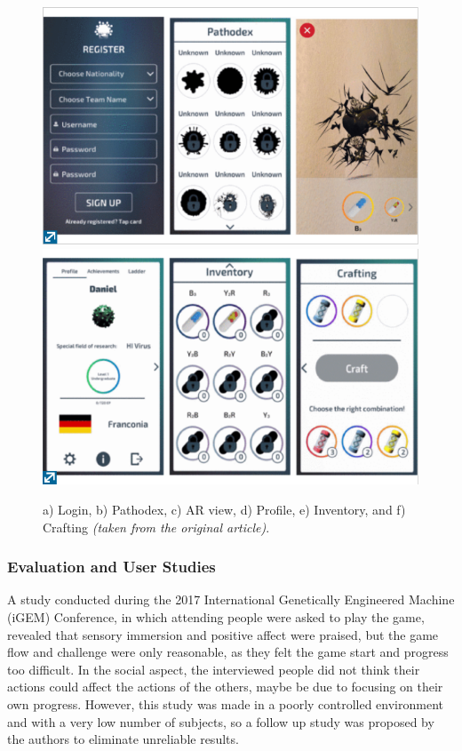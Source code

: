 \documentclass[runningheads]{llncs}
\begin{document}
\begin{figure}
    \centering
    \includegraphics[scale = 0.38]{Pathomon1.png}
    \includegraphics[scale = 0.38]{Pathomon2.png}
    \caption{a) Login, b) Pathodex, c) AR view, d) Profile, e) Inventory, and f) Crafting \textit{(taken from the original article)}.}
    \label{fig:pathomon}
\end{figure}

\subsubsection{Evaluation and User Studies}
\par A study conducted during the 2017 International Genetically Engineered Machine (iGEM) Conference, in which attending people were asked to play the game, revealed that sensory immersion and positive affect were praised, but the game flow and challenge were only reasonable, as they felt the game start and progress too difficult. In the social aspect, the interviewed people did not think their actions could affect the actions of the others, maybe be due to focusing on their own progress. However, this study was made in a poorly controlled environment and with a very low number of subjects, so a follow up study was proposed by the authors to eliminate unreliable results.
\end{document}
